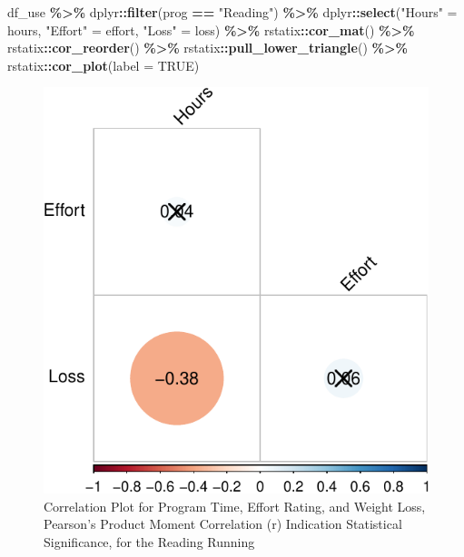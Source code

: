 \documentclass[
]{article}
\newenvironment{Shaded}{\begin{snugshade}}{\end{snugshade}}
\newcommand{\AttributeTok}[1]{\textcolor[rgb]{0.13,0.29,0.53}{#1}}
\newcommand{\ConstantTok}[1]{\textcolor[rgb]{0.56,0.35,0.01}{#1}}
\newcommand{\FunctionTok}[1]{\textcolor[rgb]{0.13,0.29,0.53}{\textbf{#1}}}
\newcommand{\NormalTok}[1]{#1}
\newcommand{\OtherTok}[1]{\textcolor[rgb]{0.56,0.35,0.01}{#1}}
\newcommand{\SpecialCharTok}[1]{\textcolor[rgb]{0.81,0.36,0.00}{\textbf{#1}}}
\newcommand{\StringTok}[1]{\textcolor[rgb]{0.31,0.60,0.02}{#1}}
\begin{document}
\clearpage

\begin{Shaded}
\begin{Highlighting}[]
\NormalTok{df\_use }\SpecialCharTok{\%\textgreater{}\%} 
\NormalTok{  dplyr}\SpecialCharTok{::}\FunctionTok{filter}\NormalTok{(prog }\SpecialCharTok{==} \StringTok{"Reading"}\NormalTok{) }\SpecialCharTok{\%\textgreater{}\%} 
\NormalTok{  dplyr}\SpecialCharTok{::}\FunctionTok{select}\NormalTok{(}\StringTok{"Hours"} \OtherTok{=}\NormalTok{ hours, }
                \StringTok{"Effort"} \OtherTok{=}\NormalTok{ effort, }
                \StringTok{"Loss"} \OtherTok{=}\NormalTok{ loss) }\SpecialCharTok{\%\textgreater{}\%} 
\NormalTok{  rstatix}\SpecialCharTok{::}\FunctionTok{cor\_mat}\NormalTok{() }\SpecialCharTok{\%\textgreater{}\%}   
\NormalTok{  rstatix}\SpecialCharTok{::}\FunctionTok{cor\_reorder}\NormalTok{() }\SpecialCharTok{\%\textgreater{}\%}
\NormalTok{  rstatix}\SpecialCharTok{::}\FunctionTok{pull\_lower\_triangle}\NormalTok{() }\SpecialCharTok{\%\textgreater{}\%}
\NormalTok{  rstatix}\SpecialCharTok{::}\FunctionTok{cor\_plot}\NormalTok{(}\AttributeTok{label =} \ConstantTok{TRUE}\NormalTok{)}
\end{Highlighting}
\end{Shaded}

\begin{figure}[hb]

\includegraphics{Appendix_ex_weightloss_files/figure-latex/unnamed-chunk-26-1} \hfill{}

\caption{Correlation Plot for Program Time, Effort Rating, and Weight Loss, Pearson's Product Moment Correlation (r) Indication Statistical Significance, for the Reading Running}\label{fig:unnamed-chunk-26}
\end{figure}
\end{document}
